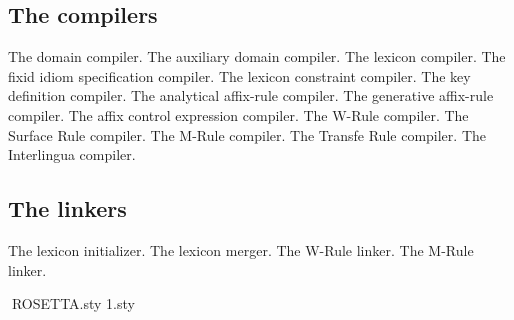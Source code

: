 \subsection{The compilers}
\bsc
{} The domain compiler.
 The auxiliary domain compiler.
 The lexicon compiler.
 The fixid idiom specification compiler.
 The lexicon constraint compiler.
 The key definition compiler.
 The analytical affix-rule compiler.
 The generative affix-rule compiler.
 The affix control expression compiler.
 The W-Rule compiler.
 The Surface Rule compiler.
 The M-Rule compiler.
 The Transfe Rule compiler.
 The Interlingua compiler.
\esc
\subsection{The linkers}
\bsc
{} The lexicon initializer.
 The lexicon merger.
 The W-Rule linker.
 The M-Rule linker.
\esc
\begin{theindex}

\end{theindex}



ROSETTA.sty
\def\@ptsize{1}
\@namedef{ds@10pt}{\def\@ptsize{0}}
\@namedef{ds@12pt}{\def\@ptsize{2}}
\@twosidetrue
\@mparswitchtrue
\def\ds@draft{\overfullrule 5pt}
\@options
\@ptsize.sty\relax


\def\labelenumi{\arabic{enumi}.}
\def\theenumi{\arabic{enumi}}
\def\labelenumii{(\alph{enumii})}
\def\theenumii{\alph{enumii}}
\def\p@enumii{\theenumi}
\def\labelenumiii{\roman{enumiii}.}
\def\theenumiii{\roman{enumiii}}
\def\p@enumiii{\theenumi(\theenumii)}
\def\labelenumiv{\Alph{enumiv}.}
\def\theenumiv{\Alph{enumiv}}
\def\p@enumiv{\p@enumiii\theenumiii}
\def\labelitemi{$\bullet$}
\def\labelitemii{\bf --}
\def\labelitemiii{$\ast$}
\def\labelitemiv{$\cdot$}
\def\verse{
   \let\\=\@centercr
   \list{}{\itemsep\z@ \itemindent -1.5em\listparindent \itemindent
      \rightmargin\leftmargin\advance\leftmargin 1.5em}
   \item[]}
\let\endverse\endlist
\def\quotation{
   \list{}{\listparindent 1.5em
      \itemindent\listparindent
      \rightmargin\leftmargin \parsep 0pt plus 1pt}\item[]}
\let\endquotation=\endlist
\def\quote{
   \list{}{\rightmargin\leftmargin}\item[]}
\let\endquote=\endlist
\def\descriptionlabel#1{\hspace\labelsep \bf #1}
\def\description{
   \list{}{\labelwidth\z@ \itemindent-\leftmargin
      \let\makelabel\descriptionlabel}}
\let\enddescription\endlist



